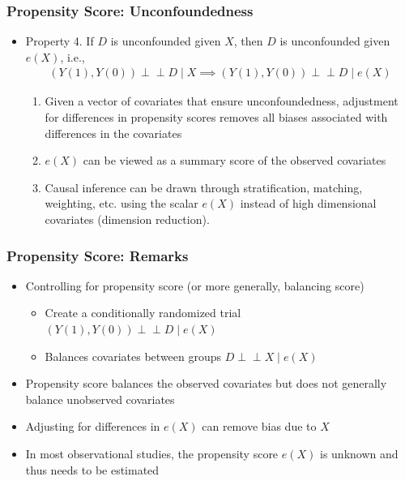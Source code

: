 \documentclass[10pt, handout]{beamer}
\newcommand{\ind}{\perp\!\!\!\!\perp}
\begin{document}
    \begin{frame}
      \frametitle{Propensity Score: Unconfoundedness}

      \begin{itemize}
        \item Property 4. If $D$ is unconfounded given $X$, then $D$ is unconfounded given $e(X)$, i.e.,
        \begin{align*}
          \left( Y(1), Y(0) \right) \ind D \mid X \implies \left( Y(1), Y(0) \right) \ind D \mid e(X)
        \end{align*}
        \begin{enumerate}
          \item Given a vector of covariates that ensure unconfoundedness, adjustment for differences in propensity scores removes all biases associated with differences in the covariates
          \item $e(X)$ can be viewed as a summary score of the observed covariates
          \item Causal inference can be drawn through stratification, matching, weighting, etc. using the scalar $e(X)$ instead of high dimensional covariates (dimension reduction).
        \end{enumerate}
      \end{itemize}

    \end{frame}
    

    \begin{frame}
      \frametitle{Propensity Score: Remarks}

      \begin{itemize}
        \item Controlling for propensity score (or more generally, balancing score)
        \begin{itemize}
          \item Create a conditionally randomized trial $\left( Y(1), Y(0) \right) \ind D \mid e(X)$
          \item Balances covariates between groups $D \ind X \mid e(X)$
        \end{itemize}
        \item Propensity score balances the observed covariates but does not generally balance unobserved covariates
        \item Adjusting for differences in $e(X)$ can remove bias due to $X$
        \item In most observational studies, the propensity score $e(X)$ is unknown and thus needs to be estimated
      \end{itemize}

    \end{frame}
\end{document}
